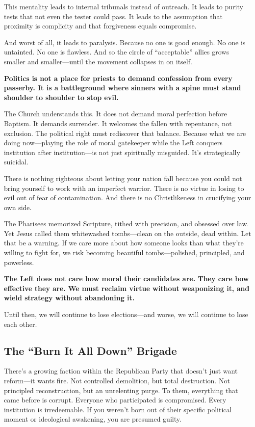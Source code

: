 This mentality leads to internal tribunals instead of outreach. It leads to purity tests that not even the tester could pass. It leads to the assumption that proximity is complicity and that forgiveness equals compromise.

And worst of all, it leads to paralysis. Because no one is good enough. No one is untainted. No one is flawless. And so the circle of ``acceptable'' allies grows smaller and smaller—until the movement collapses in on itself.

\textbf{Politics is not a place for priests to demand confession from every passerby. It is a battleground where sinners with a spine must stand shoulder to shoulder to stop evil.}

The Church understands this. It does not demand moral perfection before Baptism. It demands surrender. It welcomes the fallen with repentance, not exclusion. The political right must rediscover that balance. Because what we are doing now—playing the role of moral gatekeeper while the Left conquers institution after institution—is not just spiritually misguided. It’s strategically suicidal.

There is nothing righteous about letting your nation fall because you could not bring yourself to work with an imperfect warrior. There is no virtue in losing to evil out of fear of contamination. And there is no Christlikeness in crucifying your own side.

The Pharisees memorized Scripture, tithed with precision, and obsessed over law. Yet Jesus called them whitewashed tombs—clean on the outside, dead within. Let that be a warning. If we care more about how someone looks than what they’re willing to fight for, we risk becoming beautiful tombs—polished, principled, and powerless.

\textbf{The Left does not care how moral their candidates are. They care how effective they are. We must reclaim virtue without weaponizing it, and wield strategy without abandoning it.}

Until then, we will continue to lose elections—and worse, we will continue to lose each other.







\subsection*{The ``Burn It All Down'' Brigade}

There’s a growing faction within the Republican Party that doesn’t just want reform—it wants fire. Not controlled demolition, but total destruction. Not principled reconstruction, but an unrelenting purge. To them, everything that came before is corrupt. Everyone who participated is compromised. Every institution is irredeemable. If you weren’t born out of their specific political moment or ideological awakening, you are presumed guilty.

